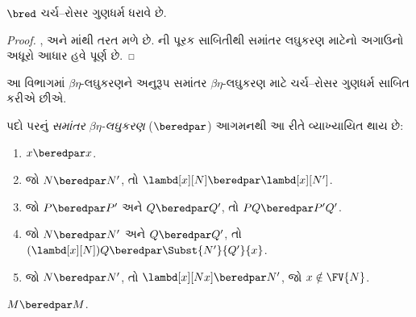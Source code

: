 \begin{thm}
  $\bred$ ચર્ચ--રોસર ગુણધર્મ ધરાવે છે.
\end{thm}

\begin{proof}
  ,  અને
  માંથી તરત મળે છે.
  ની પૂરક સાબિતીથી
  સમાંતર લઘુકરણ માટેનો અગાઉનો અધૂરો આધાર હવે પૂર્ણ છે.
\end{proof}
\endgroup

\begingroup
\makeatletter{}\makeatother


\label{guunit:OLP-0371}


આ વિભાગમાં $\beta\eta$-લઘુકરણને અનુરૂપ સમાંતર
$\beta\eta$-લઘુકરણ માટે ચર્ચ--રોસર ગુણધર્મ
સાબિત કરીએ છીએ.

\begin{defn} 
  પદો પરનું \emph{સમાંતર $\beta\eta$-લઘુકરણ}
  ($\beredpar$) આગમનથી આ રીતે વ્યાખ્યાયિત થાય છે:
  \begin{enumerate}
    \item {} $x \beredpar x$.
    \item {} જો $N \beredpar N'$,
      તો $\lambd[x][N] \beredpar \lambd[x][N']$.
    \item {} જો $P \beredpar P'$ અને
      $Q \beredpar Q'$, તો $PQ \beredpar P'Q'$.
    \item {} જો $N \beredpar N'$ અને
      $Q \beredpar Q'$, તો
      $(\lambd[x][N])Q \beredpar \Subst{N'}{Q'}{x}$.
    \item {} જો $N \beredpar N'$,
      તો $\lambd[x][Nx] \beredpar N'$, જો
      $x \notin \FV{N}$.
  \end{enumerate}
\end{defn}

\begin{thm}
  $M \beredpar M$.
\end{thm}

